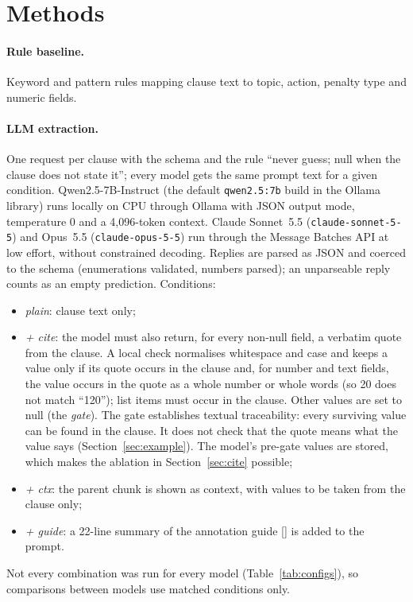 \documentclass[11pt,a4paper]{article}
\newcommand{\res}[1]{{\small[\path{#1}]}}
\begin{document}
\section{Methods}\label{sec:methods}

\paragraph{Rule baseline.} Keyword and pattern rules mapping clause text to topic, action, penalty type and numeric fields.

\paragraph{LLM extraction.} One request per clause with the schema and the rule ``never guess; null when the clause does not state it''; every model gets the same prompt text for a given condition. Qwen2.5-7B-Instruct (the default \texttt{qwen2.5:7b} build in the Ollama library) runs locally on CPU through Ollama with JSON output mode, temperature 0 and a 4,096-token context. Claude Sonnet~5.5 (\texttt{claude-sonnet-5-5}) and Opus~5.5 (\texttt{claude-opus-5-5}) run through the Message Batches API at low effort, without constrained decoding. Replies are parsed as JSON and coerced to the schema (enumerations validated, numbers parsed); an unparseable reply counts as an empty prediction. Conditions:
\begin{itemize}
  \item \emph{plain}: clause text only;
  \item \emph{+ cite}: the model must also return, for every non-null field, a verbatim quote from the clause. A local check normalises whitespace and case and keeps a value only if its quote occurs in the clause and, for number and text fields, the value occurs in the quote as a whole number or whole words (so 20 does not match ``120''); list items must occur in the clause. Other values are set to null (the \emph{gate}). The gate establishes textual traceability: every surviving value can be found in the clause. It does not check that the quote means what the value says (Section~\ref{sec:example}). The model's pre-gate values are stored, which makes the ablation in Section~\ref{sec:cite} possible;
  \item \emph{+ ctx}: the parent chunk is shown as context, with values to be taken from the clause only;
  \item \emph{+ guide}: a 22-line summary of the annotation guide \res{docs/prompt_guidelines.txt} is added to the prompt.
\end{itemize}
Not every combination was run for every model (Table~\ref{tab:configs}), so comparisons between models use matched conditions only.
\end{document}
